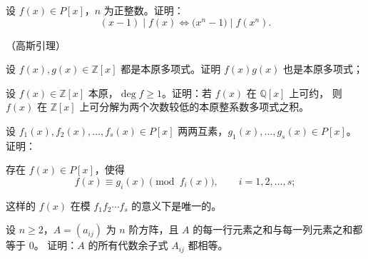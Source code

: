 \documentclass[11pt,a4paper,fontset=windows]{ctexart}
\begin{document}
\begin{qs}[resume*]
\item 设 $f(x)\in P[x]$，$n$ 为正整数。证明：
\[
(x-1)\mid f(x)\iff \bigl(x^{n}-1\bigr)\mid f(x^{n}).
\]

\item （高斯引理）
\begin{sub}
\item 设 $f(x),g(x)\in\mathbb{Z}[x]$ 都是本原多项式。证明 $f(x)g(x)$ 也是本原多项式；
\item 设 $f(x)\in\mathbb{Z}[x]$ 本原，$\deg f\ge 1$。证明：若 $f(x)$ 在 $\mathbb{Q}[x]$ 上可约，
      则 $f(x)$ 在 $\mathbb{Z}[x]$ 上可分解为两个次数较低的本原整系数多项式之积。
\end{sub}

\item 设 $f_1(x),f_2(x),\ldots,f_s(x)\in P[x]$ 两两互素，$g_1(x),\ldots,g_s(x)\in P[x]$。证明：
\begin{sub}
\item 存在 $f(x)\in P[x]$，使得
\[
f(x)\equiv g_i(x)\pmod{f_i(x)},\qquad i=1,2,\ldots,s;
\]
\item 这样的 $f(x)$ 在模 $f_1f_2\cdots f_s$ 的意义下是唯一的。
\end{sub}

\item 设 $n\ge 2$，$A=(a_{ij})$ 为 $n$ 阶方阵，且 $A$ 的每一行元素之和与每一列元素之和都等于 $0$。
证明：$A$ 的所有代数余子式 $A_{ij}$ 都相等。
\end{qs}
\end{document}

